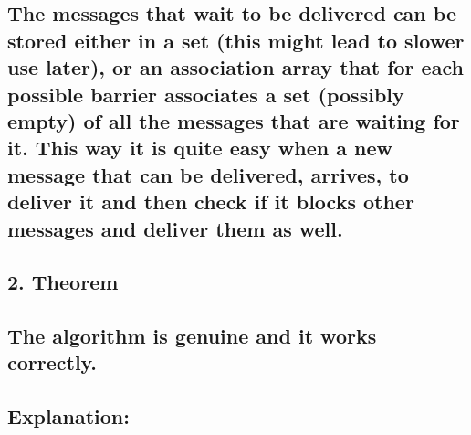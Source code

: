 \documentclass[12pt]{article}
\theoremstyle{plain}
\begin{document}
\subsection*{
  The messages that wait to be delivered can be stored either in a set (this
  might lead to slower use later), or an association array that for each possible
  barrier associates a set (possibly empty) of all the messages that are waiting
  for it. This way it is quite easy when a new message that can be delivered,
  arrives, to deliver it and then check if it blocks other messages and 
  deliver them as well.
}
 \subsection*{2. Theorem}

 \subsection*{The algorithm is genuine and it works correctly.
 }

 \subsection*{Explanation:}

 \subsection*{
 }
             
  
\end{document}
